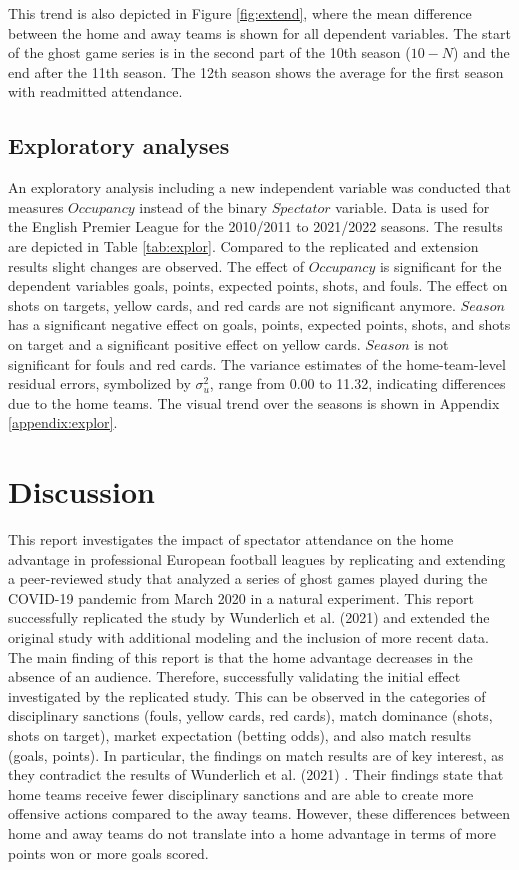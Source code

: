 This trend is also depicted in Figure \ref{fig:extend}, where the mean 
 difference between the home and away teams is shown for all dependent variables. The start of the ghost game series is in the second part of the 10th season ($10-N$) and the end after the 11th season. The 12th season shows the average for the first season with readmitted attendance.

\subsection{Exploratory analyses}
An exploratory analysis including a new independent variable was conducted that measures $Occupancy$ instead of the binary $Spectator$ variable. Data is used for the English Premier League for the 2010/2011 to 2021/2022 seasons. The results are depicted in Table \ref{tab:explor}. Compared to the replicated and extension results slight changes are observed. The effect of $Occupancy$ is significant for the dependent variables goals, points, expected points, shots, and fouls. The effect on shots on targets, yellow cards, and red cards are not significant anymore. $Season$ has a significant negative effect on goals, points, expected points, shots, and shots on target and a significant positive effect on yellow cards. $Season$ is not significant for fouls and red cards. The variance estimates of the home-team-level residual errors, symbolized by $\sigma^2_{u}$, range from 0.00 to 11.32, indicating differences due to the home teams. The visual trend over the seasons is shown in Appendix \ref{appendix:explor}.



\newpage

\section{Discussion}

This report investigates the impact of spectator attendance on the home advantage in professional European football leagues by replicating and extending a peer-reviewed study that analyzed a series of ghost games played during the COVID-19 pandemic from March 2020 in a natural experiment. This report successfully replicated the study by Wunderlich et al. (2021) \cite{wunderlich2021does} and extended the original study with additional modeling and the inclusion of more recent data. The main finding of this report is that the home advantage decreases in the absence of an audience. Therefore, successfully validating the initial effect investigated by the replicated study. This can be observed in the categories  of disciplinary sanctions (fouls, yellow cards, red cards), match dominance (shots, shots on target), market expectation (betting odds), and also match results (goals, points). In particular, the findings on match results are of key interest, as they contradict the results of Wunderlich et al. (2021) \cite{wunderlich2021does}. Their findings state that home teams receive fewer disciplinary sanctions and are able to create more offensive actions compared to the away teams. However, these differences between home and away teams do not translate into a home advantage in terms of more points won or more goals scored.  


